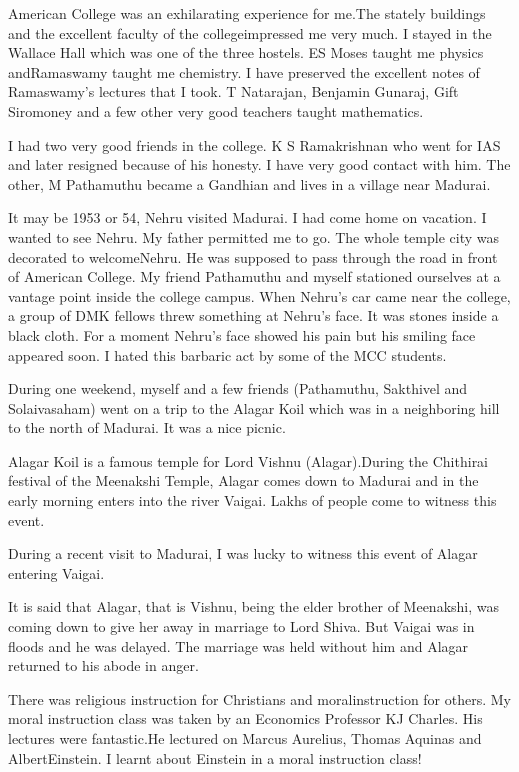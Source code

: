 American College was an exhilarating experience for me.\break The stately 
buildings and the excellent faculty of the college\break impressed me very 
much. I stayed in the Wallace Hall which was one of the three hostels. 
ES Moses taught me physics and\break Ramaswamy taught me chemistry. I have 
preserved the exce\-llent notes of Ramaswa\-my's lectures that I took. T 
Natarajan, Benjamin Guna\-raj, Gift Siromoney and a few other very good 
teachers taught mathematics.

I had two very good friends in the college. K S Ramakrishnan who went 
for IAS and later resigned because of his honesty. I have very good 
contact with him. The other, M Pathamuthu became a Gandhian and lives in 
a village near Madurai.

It may be 1953 or 54, Nehru visited Madurai. I had come home on 
vacation. I wanted to see Nehru. My father permitted\- me to go. The whole 
temple city was decorated to welcome\break Nehru. He was supposed to pass 
through the road in front of American College. My friend Pathamuthu and 
myself stationed ourselves at a vantage point inside the college campus. 
When Nehru's car came near the college, a group of DMK fellows threw 
something at Nehru's face. It was stones inside a black cloth. For a 
moment Nehru's face showed his pain but his smiling face appea\-red soon. 
I hated this barbaric act by some of the MCC studen\-ts.

During one weekend, myself and a few friends (Pathamuthu, Sakthivel and 
Solaivasaham) went on a trip to the Alagar Koil which was in a 
neighboring hill to the north of Madurai. It was a nice picnic.

Alagar Koil is a famous temple for Lord Vishnu (Alagar).\break During the 
Chithirai festival of the Meenakshi Temple, Alagar comes down to 
Madurai and in the early morning enters into the river Vaigai. Lakhs of 
people come to witness this event.

During a recent visit to Madurai, I was lucky to witness this event of 
Alagar entering Vaigai.

It is said that Alagar, that is Vishnu, being the elder brother of 
Meenakshi, was coming down to give her away in marriage to Lord Shiva. 
But Vaigai was in floods and he was delayed. The marriage was held 
without him and Alagar returned to his abode in anger.
 
There was religious instruction for Christians and moral\break instruction for 
others. My moral instruction class was taken by an Economics Professor 
KJ Charles. His lectures were fantastic.\break He lectured on Marcus Aurelius, 
Thomas Aquinas and Albert\break Einstein. I learnt about Einstein in a moral 
instruction class!

